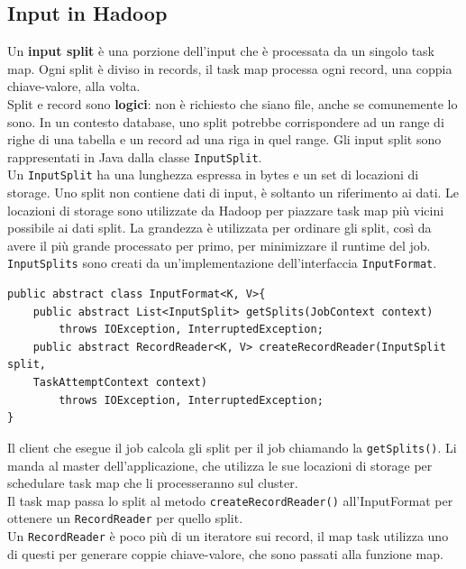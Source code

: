 \documentclass{article}
\begin{document}
\begin{appendices}
\subsection{Input in Hadoop}
Un \textbf{input split} è una porzione dell'input che è processata da un singolo task map. Ogni split è diviso in records, il task map processa ogni record, una coppia chiave-valore, alla volta. \\
Split e record sono \textbf{logici}: non è richiesto che siano file, anche se comunemente lo sono. In un contesto database, uno split potrebbe corrispondere ad un range di righe di una tabella e un record ad una riga in quel range. Gli input split sono rappresentati in Java dalla classe \texttt{InputSplit}. \\
Un \texttt{InputSplit} ha una lunghezza espressa in bytes e un set di locazioni di storage. Uno split non contiene dati di input, è soltanto un riferimento ai dati. Le locazioni di storage sono utilizzate da Hadoop per piazzare task map più vicini possibile ai dati split. La grandezza è utilizzata per ordinare gli split, così da avere il più grande processato per primo, per minimizzare il runtime del job. \\
\texttt{InputSplits} sono creati da un'implementazione dell'interfaccia \texttt{InputFormat}.
\begin{lstlisting}
public abstract class InputFormat<K, V>{
    public abstract List<InputSplit> getSplits(JobContext context)
        throws IOException, InterruptedException;
    public abstract RecordReader<K, V> createRecordReader(InputSplit split, 
    TaskAttemptContext context)
        throws IOException, InterruptedException;
}
\end{lstlisting}
Il client che esegue il job calcola gli split per il job chiamando la \texttt{getSplits()}. Li manda al master dell'applicazione, che utilizza le sue locazioni di storage per schedulare task map che li processeranno sul cluster. \\
Il task map passa lo split al metodo \texttt{createRecordReader()} all'InputFormat per ottenere un \texttt{RecordReader} per quello split. \\
Un \texttt{RecordReader} è poco più di un iteratore sui record, il map task utilizza uno di questi per generare coppie chiave-valore, che sono passati alla funzione map.


\end{appendices}
\end{document}
